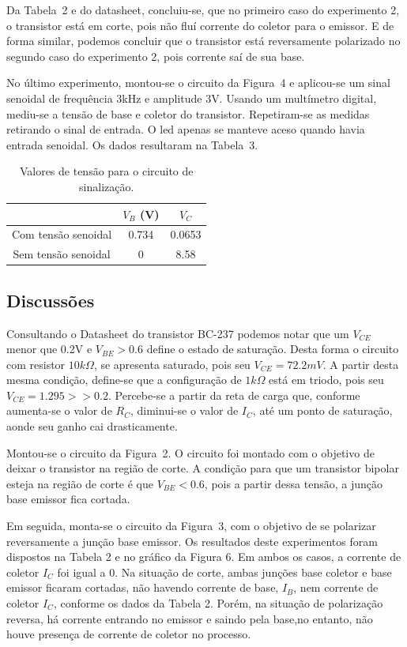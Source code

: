 \documentclass[12pt,a4paper]{article}
\begin{document}
        Da Tabela~2 e do datasheet, concluiu-se, que no primeiro caso do experimento 2,  o transistor está em corte, pois não fluí corrente do coletor
para o emissor. E de forma similar, podemos concluir que o transistor está reversamente polarizado no segundo caso do experimento 2, pois 
corrente saí de sua base.

No último experimento, montou-se o circuito da Figura~4 e aplicou-se um sinal senoidal de frequência $3$kHz e  amplitude $3$V. Usando 
um multímetro digital, mediu-se a tensão de base e coletor do transistor. Repetiram-se as medidas retirando o sinal de entrada. O led
apenas se manteve aceso quando havia entrada senoidal. 
Os dados resultaram na Tabela~3.

\begin{table}[htpb]
  \centering
  \caption{Valores de tensão para o circuito de sinalização.}
  \label{tab:label}
  \begin{tabular}{c c c}
    \\ \toprule
    &$V_{B}$ (V) &$V_{C}$   \\ \midrule
    Com tensão senoidal & 0.734& 0.0653 \\ \midrule 
    Sem tensão senoidal & 0& 8.58 \\ \bottomrule
  \end{tabular}
\end{table}
\subsection{Discussões}
Consultando o Datasheet do transistor BC-237 podemos notar que um $V_{CE}$ menor que 0.2V e $V_{BE}>0.6$ define o estado de saturação. Desta forma
o circuito com resistor $10k\Omega$, se apresenta saturado, pois seu $V_{CE}=72.2mV$. A partir desta mesma condição, define-se que 
a configuração de $1k\Omega$ está em triodo, pois seu $V_{CE}=1.295>>0.2$. Percebe-se a partir da reta de carga  que, conforme aumenta-se
o valor de $R_C$, diminui-se o valor de $I_C$, até um ponto de saturação,
aonde seu ganho cai drasticamente.

Montou-se o circuito da Figura~2. O circuito  foi montado com
o objetivo de deixar o transistor na região de corte. 
A condição para que um transistor bipolar esteja na região de corte é que $V_{BE}<0.6$, pois a partir dessa tensão, a junção base emissor
fica cortada. 

Em seguida, monta-se o circuito da Figura~3, com o objetivo de
se polarizar reversamente a junção base emissor. Os resultados deste experimentos foram
dispostos na Tabela 2 e no gráfico da Figura 6. Em ambos os casos, a corrente de coletor
$I_C$ foi igual a 0. Na situação de corte, ambas junções base coletor e base emissor ficaram
cortadas, não havendo corrente de base, $I_B$, nem corrente de coletor $I_C$, conforme os
dados da Tabela 2. Porém, na situação de polarização reversa, há corrente entrando no emissor
e saindo pela base,no entanto,  não houve presença de corrente de coletor no processo.
\end{document}
